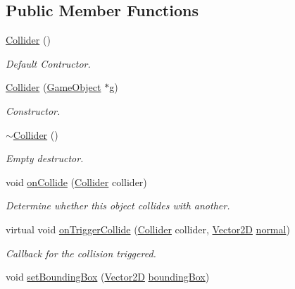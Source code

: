 \subsection*{Public Member Functions}
\begin{DoxyCompactItemize}
\item 
\mbox{\label{class_collider_aa7186870221f868bbc74c3ae8609fa66}} 
\mbox{\hyperlink{class_collider_aa7186870221f868bbc74c3ae8609fa66}{Collider}} ()
\begin{DoxyCompactList}\small\item\em Default Contructor. \end{DoxyCompactList}\item 
\mbox{\hyperlink{class_collider_a5dcac8919b41b7dec9a7516a8d9ac4f4}{Collider}} (\mbox{\hyperlink{class_game_object}{Game\+Object}} $\ast$g)
\begin{DoxyCompactList}\small\item\em Constructor. \end{DoxyCompactList}\item 
\mbox{\hyperlink{class_collider_a564acde9860f875a32a6638c573d87be}{$\sim$\+Collider}} ()
\begin{DoxyCompactList}\small\item\em Empty destructor. \end{DoxyCompactList}\item 
void \mbox{\hyperlink{class_collider_a76e3c5867ef3ecd2057b9c091940abee}{on\+Collide}} (\mbox{\hyperlink{class_collider}{Collider}} collider)
\begin{DoxyCompactList}\small\item\em Determine whether this object collides with another. \end{DoxyCompactList}\item 
virtual void \mbox{\hyperlink{class_collider_ae17ec8f9110acbc4df79d5addf8ac401}{on\+Trigger\+Collide}} (\mbox{\hyperlink{class_collider}{Collider}} collider, \mbox{\hyperlink{struct_vector2_d}{Vector2D}} \mbox{\hyperlink{class_collider_a9326e2676880c40f35832ed2c6d6b073}{normal}})
\begin{DoxyCompactList}\small\item\em Callback for the collision triggered. \end{DoxyCompactList}\item 
\mbox{\label{class_collider_a45721b32a9fb6cdf8291c0db115ff54d}} 
void \mbox{\hyperlink{class_collider_a45721b32a9fb6cdf8291c0db115ff54d}{set\+Bounding\+Box}} (\mbox{\hyperlink{struct_vector2_d}{Vector2D}} \mbox{\hyperlink{class_collider_a078ab635e6ae3abe5be21ad0a4eef85b}{bounding\+Box}})

\end{DoxyCompactItemize}
